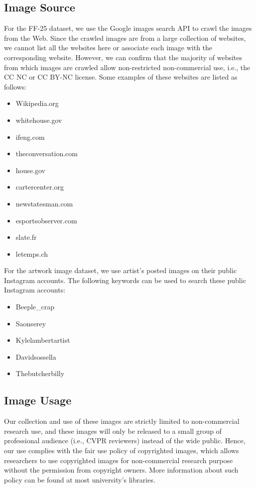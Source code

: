 \documentclass{article}
\begin{document}
\subsection{Image Source}
For the FF-25 dataset, we use the Google images search API to crawl the images from the Web. Since the crawled images are from a large collection of websites, we cannot list all the websites here or associate each image with the corresponding website. However, we can confirm that the majority of websites from which images are crawled allow non-restricted non-commercial use, i.e., the CC NC or CC BY-NC license. Some examples of these websites are listed as follows:

\vspace{0.1in}
\begin{itemize}
	\item Wikipedia.org
	\item whitehouse.gov
	\item ifeng.com
	\item theconversation.com
	\item house.gov
	\item cartercenter.org
	\item newstatesman.com
	\item esportsobserver.com
	\item slate.fr
	\item letemps.ch
\end{itemize}

\vspace{0.1in}
For the artwork image dataset, we use artist's posted images on their public Instagram accounts. The following keywords can be used to search these public Instagram accounts:


\begin{itemize}
	\item Beeple\_crap
	\item Saonserey
	\item Kylelambertartist
	\item Davidsossella
	\item Thebutcherbilly
\end{itemize}

\subsection{Image Usage}
Our collection and use of these images are strictly limited to non-commercial research use, and these images will only be released to a small group of professional audience (i.e., CVPR reviewers) instead of the wide public. Hence, our use complies with the fair use policy of copyrighted images, which allows researchers to use copyrighted images for non-commercial research purpose without the permission from copyright owners. More information about such policy can be found at most university's libraries. 
\end{document}
